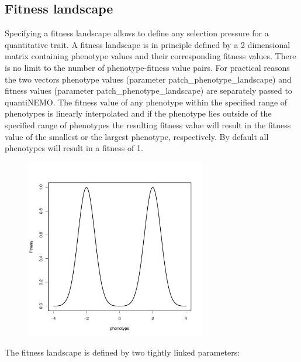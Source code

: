 \documentclass[letterpaper,12pt,oneside]{book}
\begin{document}
\subsection{Fitness landscape}
Specifying a fitness landscape allows to define any selection pressure for a quantitative trait. A fitness landscape is in principle defined by a 2 dimensional matrix containing phenotype values and their corresponding fitness values. There is no limit to the number of phenotype-fitness value pairs. For practical reasons the two vectors phenotype values (parameter \textsf{patch\_phenotype\_landscape}) and fitness values (parameter \textsf{patch\_phenotype\_landscape}) are separately passed to quantiNEMO. The fitness value of any phenotype within the specified range of phenotypes is linearly interpolated and if the phenotype lies outside of the specified range of phenotypes the resulting fitness value will result in the fitness value of the smallest or the largest phenotype, respectively. By default all phenotypes will result in a fitness of 1. 

\begin{figure}[h]
	\centering
		\includegraphics[width=0.70\textwidth]{fitness-landscape-selection.pdf}
	\label{fig:fitness-landscape-selection}
\end{figure}

The fitness landscape is defined by two tightly linked parameters:
\end{document}
